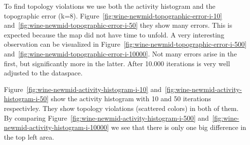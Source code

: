 \documentclass{acm_proc_article-sp}
\begin{document}
To find topology violations we use both the activity histogram and the topographic error (k=8).
Figure~\ref{fig:wine-newmid-topographic-error-i-10} and~\ref{fig:wine-newmid-topographic-error-i-50} they show many errors.
This is expected because the map did not have time to unfold. A very interesting observation can be
visualized in Figure~\ref{fig:wine-newmid-topographic-error-i-500} and~\ref{fig:wine-newmid-topographic-error-i-10000}.
Not many errors arise in the first, but significantly more in the latter. After 10.000 iterations is very well adjusted to
the dataspace.

Figure~\ref{fig:wine-newmid-activity-histogram-i-10} and~\ref{fig:wine-newmid-activity-histogram-i-50} show the activity
histogram with 10 and 50 iterations respectivley. They show topology violations (scattered colors) in both of them.
By comparing Figure~\ref{fig:wine-newmid-activity-histogram-i-500} and~\ref{fig:wine-newmid-activity-histogram-i-10000} 
we see that there is only one big difference in the top left area.
\end{document}
